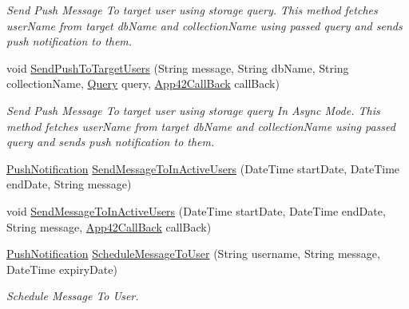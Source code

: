 \begin{DoxyCompactItemize}
\begin{DoxyCompactList}\small\item\em Send Push Message To target user using storage query. This method fetches user\+Name from target db\+Name and collection\+Name using passed query and sends push notification to them. \end{DoxyCompactList}\item 
void \hyperlink{classcom_1_1shephertz_1_1app42_1_1paas_1_1sdk_1_1csharp_1_1push_notification_1_1_push_notification_service_a390915a649b3772d009f7b09f0feb789}{Send\+Push\+To\+Target\+Users} (String message, String db\+Name, String collection\+Name, \hyperlink{classcom_1_1shephertz_1_1app42_1_1paas_1_1sdk_1_1csharp_1_1storage_1_1_query}{Query} query, \hyperlink{interfacecom_1_1shephertz_1_1app42_1_1paas_1_1sdk_1_1csharp_1_1_app42_call_back}{App42\+Call\+Back} call\+Back)
\begin{DoxyCompactList}\small\item\em Send Push Message To target user using storage query In Async Mode. This method fetches user\+Name from target db\+Name and collection\+Name using passed query and sends push notification to them. \end{DoxyCompactList}\item 
\hyperlink{classcom_1_1shephertz_1_1app42_1_1paas_1_1sdk_1_1csharp_1_1push_notification_1_1_push_notification}{Push\+Notification} \hyperlink{classcom_1_1shephertz_1_1app42_1_1paas_1_1sdk_1_1csharp_1_1push_notification_1_1_push_notification_service_a148bc15bffd3a32feda03affa4cbd307}{Send\+Message\+To\+In\+Active\+Users} (Date\+Time start\+Date, Date\+Time end\+Date, String message)
\item 
void \hyperlink{classcom_1_1shephertz_1_1app42_1_1paas_1_1sdk_1_1csharp_1_1push_notification_1_1_push_notification_service_ae8b5487f00f77d31a472a34632bf8850}{Send\+Message\+To\+In\+Active\+Users} (Date\+Time start\+Date, Date\+Time end\+Date, String message, \hyperlink{interfacecom_1_1shephertz_1_1app42_1_1paas_1_1sdk_1_1csharp_1_1_app42_call_back}{App42\+Call\+Back} call\+Back)
\item 
\hyperlink{classcom_1_1shephertz_1_1app42_1_1paas_1_1sdk_1_1csharp_1_1push_notification_1_1_push_notification}{Push\+Notification} \hyperlink{classcom_1_1shephertz_1_1app42_1_1paas_1_1sdk_1_1csharp_1_1push_notification_1_1_push_notification_service_acc8e2b5c38fffd2413f6fb706ddb6bbc}{Schedule\+Message\+To\+User} (String username, String message, Date\+Time expiry\+Date)
\begin{DoxyCompactList}\small\item\em Schedule Message To User. \end{DoxyCompactList}\item 

\end{DoxyCompactItemize}
